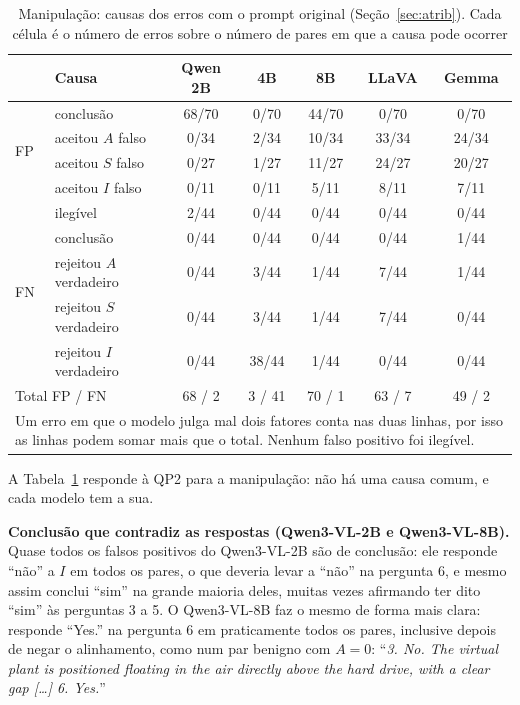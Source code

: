 \documentclass[conference]{IEEEtran}
\begin{document}
\begin{table}[!t]
\renewcommand{\arraystretch}{1.05}
\caption{Manipulação: causas dos erros com o prompt original (Seção~\ref{sec:atrib}). Cada célula é o
número de erros sobre o número de pares em que a causa pode ocorrer}
\label{tab:causas}
\centering
\footnotesize
\setlength{\tabcolsep}{2.6pt}
\begin{tabular}{llccccc}
\toprule
 & Causa & Qwen 2B & 4B & 8B & LLaVA & Gemma \\
\midrule
\multirow{4}{*}{FP} & conclusão & 68/70 & 0/70 & 44/70 & 0/70 & 0/70 \\
 & aceitou $A$ falso & 0/34 & 2/34 & 10/34 & 33/34 & 24/34 \\
 & aceitou $S$ falso & 0/27 & 1/27 & 11/27 & 24/27 & 20/27 \\
 & aceitou $I$ falso & 0/11 & 0/11 & 5/11 & 8/11 & 7/11 \\
\midrule
\multirow{5}{*}{FN} & ilegível & 2/44 & 0/44 & 0/44 & 0/44 & 0/44 \\
 & conclusão & 0/44 & 0/44 & 0/44 & 0/44 & 1/44 \\
 & rejeitou $A$ verdadeiro & 0/44 & 3/44 & 1/44 & 7/44 & 1/44 \\
 & rejeitou $S$ verdadeiro & 0/44 & 3/44 & 1/44 & 7/44 & 0/44 \\
 & rejeitou $I$ verdadeiro & 0/44 & 38/44 & 1/44 & 0/44 & 0/44 \\
\midrule
\multicolumn{2}{l}{Total FP / FN} & 68 / 2 & 3 / 41 & 70 / 1 & 63 / 7 & 49 / 2 \\
\bottomrule
\multicolumn{7}{L{8.2cm}}{\scriptsize Um erro em que o modelo julga mal dois fatores conta nas duas
linhas, por isso as linhas podem somar mais que o total. Nenhum falso positivo foi ilegível.}
\end{tabular}
\end{table}

A Tabela~\ref{tab:causas} responde à QP2 para a manipulação: não há uma causa comum, e cada modelo tem a
sua.

\textbf{Conclusão que contradiz as respostas (Qwen3-VL-2B e Qwen3-VL-8B).} Quase todos os falsos
positivos do Qwen3-VL-2B são de conclusão: ele responde ``não'' a $I$ em todos os pares, o que deveria
levar a ``não'' na pergunta 6, e mesmo assim conclui ``sim'' na grande maioria deles, muitas vezes
afirmando ter dito ``sim'' às perguntas 3 a 5. O Qwen3-VL-8B faz o mesmo de forma mais clara: responde
``Yes.'' na pergunta 6 em praticamente todos os pares, inclusive depois de negar o alinhamento, como num
par benigno com $A=0$: ``\emph{3. No. The virtual plant is positioned floating in the air directly above
the hard drive, with a clear gap [\dots] 6. Yes.}''
\end{document}
